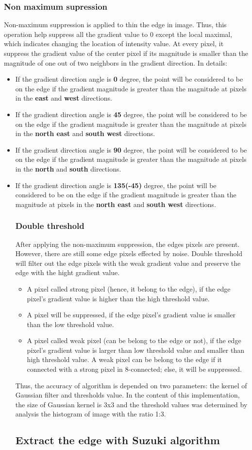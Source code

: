 \documentclass[12pt, a4paper]{article}
\begin{document}
\subsubsection{Non maximum supression}
Non-maximum suppression is applied to thin the edge in image. Thus, this operation help suppress all the gradient value to 0 except the local maximal, which indicates changing the location of intensity value. At every pixel, it suppress the gradient value of the center pixel if its magnitude is smaller than the magnitude of one out of two neighbors in the gradient direction. In details:
\begin{itemize}
	\item If the gradient direction angle is \textbf{0} degree, the point will be considered to be on the edge if the gradient magnitude is greater than the magnitude at pixels in the \textbf{east} and \textbf{west} directions.
	\item If the gradient direction angle is \textbf{45} degree, the point will be considered to be on the edge if the gradient magnitude is greater than the magnitude at pixels in the \textbf{north east} and \textbf{south west} directions.
	\item If the gradient direction angle is \textbf{90} degree, the point will be considered to be on the edge if the gradient magnitude is greater than the magnitude at pixels in the \textbf{north} and \textbf{south} directions.
	\item If the gradient direction angle is \textbf{135(-45)} degree, the point will be considered to be on the edge if the gradient magnitude is greater than the magnitude at pixels in the \textbf{north east} and \textbf{south west} directions.
	\subsubsection{Double threshold}
	After applying the non-maximum suppression, the edges pixels are present. However, there are still some edge pixels effected by noise. Double threshold will filter out the edge pixels with the weak gradient value and preserve the edge with the hight gradient value.
	\begin{itemize}
		\item A pixel called strong pixel (hence, it belong to the edge), if the edge pixel's gradient value is higher than the high threshold value.
		\item A pixel will be suppressed, if the edge pixel's gradient value is smaller than the low threshold value.
		\item A pixel called weak pixel (can be belong to the edge or not), if the edge pixel's gradient value is larger than low threshold value and smaller than high threshold value. A weak pixel can be belong to the edge if it connected with a strong pixel in 8-connected; else, it will be suppressed.
	\end{itemize}
	Thus, the accuracy of algorithm is depended on two parameters: the kernel of Gaussian filter and thresholds value. In the content of this implementation, the size of Gaussian kernel is 3x3 and the threshold values was determined by analysis the histogram of image with the ratio 1:3.
	\subsection{Extract the edge with Suzuki algorithm}
\end{itemize}
\end{document}
